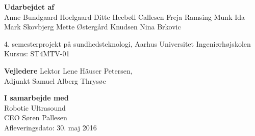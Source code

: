 \begin{titlingpage}
\textbf{Udarbejdet af}\\
Anne Bundgaard Hoelgaard \newline
Ditte Heebøll Callesen \newline
Freja Ramsing Munk \newline
Ida Mark Skovbjerg \newline	
Mette Østergård Knudsen \newline 
Nina Brkovic 

4. semesterprojekt på sundhedsteknologi, Aarhus Universitet Ingeniørhøjskolen \\
Kursus: ST4MTV-01

\textbf{Vejledere} \newline
Lektor Lene Häuser Petersen, \\
Adjunkt Samuel Alberg Thrysøe

\textbf{I samarbejde med}\\
Robotic Ultrasound\\
CEO Søren Pallesen
\\

Afleveringsdato: 30. maj 2016

\end{titlingpage}